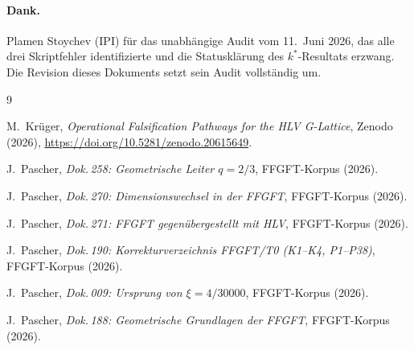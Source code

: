 \paragraph{Dank.}
Plamen Stoychev (IPI) für das unabhängige Audit vom 11.~Juni 2026,
das alle drei Skriptfehler identifizierte und die Statusklärung des
$k^*$-Resultats erzwang. Die Revision dieses Dokuments setzt sein
Audit vollständig um.

\begin{thebibliography}{9}

M.~Krüger,
\emph{Operational Falsification Pathways for the HLV G-Lattice},
Zenodo (2026),
\url{https://doi.org/10.5281/zenodo.20615649}.

J.~Pascher, \emph{Dok.\,258: Geometrische Leiter $q=2/3$},
FFGFT-Korpus (2026).

J.~Pascher, \emph{Dok.\,270: Dimensionswechsel in der FFGFT},
FFGFT-Korpus (2026).

J.~Pascher, \emph{Dok.\,271: FFGFT gegenübergestellt mit HLV},
FFGFT-Korpus (2026).

J.~Pascher, \emph{Dok.\,190: Korrekturverzeichnis FFGFT/T0
(K1--K4, P1--P38)}, FFGFT-Korpus (2026).

J.~Pascher, \emph{Dok.\,009: Ursprung von $\xi = 4/30000$},
FFGFT-Korpus (2026).

J.~Pascher, \emph{Dok.\,188: Geometrische Grundlagen der FFGFT},
FFGFT-Korpus (2026).

\end{thebibliography}
